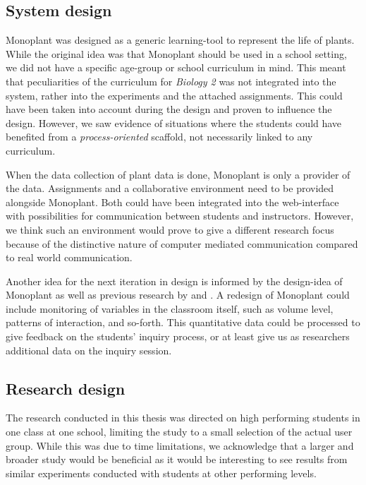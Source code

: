 \subsection{System design}
Monoplant was designed as a generic learning-tool to represent the life of plants. While the original idea was that Monoplant should be used in a school setting, we did not have a specific age-group or school curriculum in mind. This meant that peculiarities of the curriculum for \emph{Biology 2} was not integrated into the system, rather into the experiments and the attached assignments. This could have been taken into account during the design and proven to influence the design. However, we saw evidence of situations where the students could have benefited from a \emph{process-oriented} scaffold, not necessarily linked to any curriculum.

When the data collection of plant data is done, Monoplant is only a provider of the data. Assignments and a collaborative environment need to be provided alongside Monoplant. Both could have been integrated into the web-interface with possibilities for communication between students and instructors. However, we think such an environment would prove to give a different research focus because of the distinctive nature of computer mediated communication compared to real world communication. 

Another idea for the next iteration in design is informed by the design-idea of Monoplant as well as previous research by \citet{fischer1991critics} and \citet{furberg2009socio}. A redesign of Monoplant could include monitoring of variables in the classroom itself, such as volume level, patterns of interaction, and so-forth. This quantitative data could be processed to give feedback on the students' inquiry process, or at least give us as researchers additional data on the inquiry session.

\subsection{Research design}
The research conducted in this thesis was directed on high performing students in one class at one school, limiting the study to a small selection of the actual user group. While this was due to time limitations, we acknowledge that a larger and broader study would be beneficial as it would be interesting to see results from similar experiments conducted with students at other performing levels.

